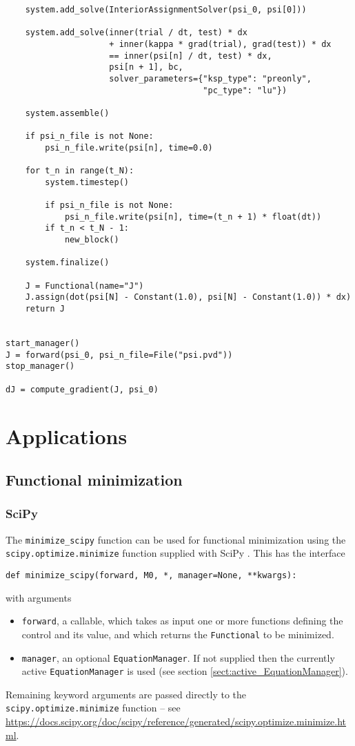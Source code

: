 \documentclass[11pt]{article}
\begin{document}
\begin{lstlisting}
    system.add_solve(InteriorAssignmentSolver(psi_0, psi[0]))

    system.add_solve(inner(trial / dt, test) * dx
                     + inner(kappa * grad(trial), grad(test)) * dx
                     == inner(psi[n] / dt, test) * dx,
                     psi[n + 1], bc,
                     solver_parameters={"ksp_type": "preonly",
                                        "pc_type": "lu"})

    system.assemble()

    if psi_n_file is not None:
        psi_n_file.write(psi[n], time=0.0)

    for t_n in range(t_N):
        system.timestep()

        if psi_n_file is not None:
            psi_n_file.write(psi[n], time=(t_n + 1) * float(dt))
        if t_n < t_N - 1:
            new_block()

    system.finalize()

    J = Functional(name="J")
    J.assign(dot(psi[N] - Constant(1.0), psi[N] - Constant(1.0)) * dx)
    return J


start_manager()
J = forward(psi_0, psi_n_file=File("psi.pvd"))
stop_manager()

dJ = compute_gradient(J, psi_0)
\end{lstlisting}

\section{Applications}

\subsection{Functional minimization}\label{sect:minimization}

\subsubsection{SciPy}

The \texttt{minimize\_scipy} function can be used for functional minimization
using the \texttt{scipy.optimize.minimize} function supplied with SciPy
\citep{virtanen2020}. This has the interface
\begin{lstlisting}
def minimize_scipy(forward, M0, *, manager=None, **kwargs):
\end{lstlisting}
with arguments
\begin{itemize}
  \item \texttt{forward}, a callable, which takes as input one or more
    functions defining the control and its value, and which returns the
    \texttt{Functional} to be minimized.
  \item \texttt{manager}, an optional \texttt{EquationManager}. If not supplied
    then the currently active \texttt{EquationManager} is used (see section
    \ref{sect:active_EquationManager}).
\end{itemize}
Remaining keyword arguments are passed directly to the
\texttt{scipy.optimize.minimize} function -- see
\url{https://docs.scipy.org/doc/scipy/reference/generated/scipy.optimize.minimize.html}.
\end{document}
